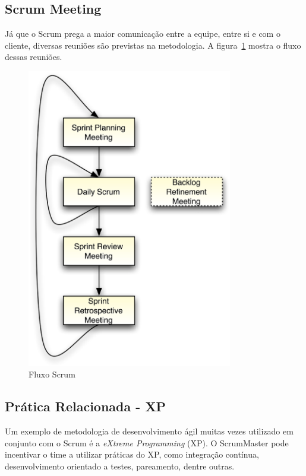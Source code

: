 \subsection{Scrum Meeting}

Já que o Scrum prega a maior comunicação entre a equipe, entre si e com o cliente,
diversas reuniões são previstas na metodologia. A figura~\ref{fig:scrum_flow}
mostra o fluxo dessas reuniões.

\begin{figure}[H]
  \centering
  \includegraphics[width=0.8\textwidth]{figuras/scrum_flow.eps}
  \caption{Fluxo Scrum}
  \label{fig:scrum_flow}
\end{figure}

\subsection{Prática Relacionada - XP}

Um exemplo de metodologia de desenvolvimento ágil muitas vezes utilizado em
conjunto com o Scrum é a \textit{eXtreme Programming} (XP). O ScrumMaster pode
incentivar o time a utilizar práticas do XP, como integração contínua, 
desenvolvimento orientado a testes, pareamento, dentre outras.

